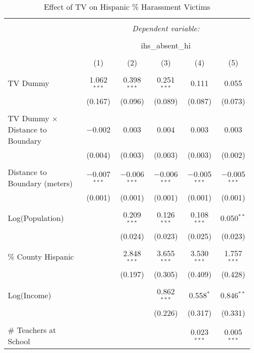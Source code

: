 
\begin{table}[!htbp] \centering 
  \caption{Effect of TV on Hispanic \% Harassment Victims} 
  \label{} 
\begin{tabular}{@{\extracolsep{-2pt}}lccccc} 
\\[-1.8ex]\hline 
\hline \\[-1.8ex] 
 & \multicolumn{5}{c}{\textit{Dependent variable:}} \\ 
\cline{2-6} 
\\[-1.8ex] & \multicolumn{5}{c}{ihs\_absent\_hi} \\ 
\\[-1.8ex] & (1) & (2) & (3) & (4) & (5)\\ 
\hline \\[-1.8ex] 
 TV Dummy & 1.062$^{***}$ & 0.398$^{***}$ & 0.251$^{***}$ & 0.111 & 0.055 \\ 
  & (0.167) & (0.096) & (0.089) & (0.087) & (0.073) \\ 
  & & & & & \\ 
 TV Dummy $\times$ Distance to Boundary & $-$0.002 & 0.003 & 0.004 & 0.003 & 0.003 \\ 
  & (0.004) & (0.003) & (0.003) & (0.003) & (0.002) \\ 
  & & & & & \\ 
 Distance to Boundary (meters) & $-$0.007$^{***}$ & $-$0.006$^{***}$ & $-$0.006$^{***}$ & $-$0.005$^{***}$ & $-$0.005$^{***}$ \\ 
  & (0.001) & (0.001) & (0.001) & (0.001) & (0.001) \\ 
  & & & & & \\ 
 Log(Population) &  & 0.209$^{***}$ & 0.126$^{***}$ & 0.108$^{***}$ & 0.050$^{**}$ \\ 
  &  & (0.024) & (0.023) & (0.025) & (0.023) \\ 
  & & & & & \\ 
 \% County Hispanic &  & 2.848$^{***}$ & 3.655$^{***}$ & 3.530$^{***}$ & 1.757$^{***}$ \\ 
  &  & (0.197) & (0.305) & (0.409) & (0.428) \\ 
  & & & & & \\ 
 Log(Income) &  &  & 0.862$^{***}$ & 0.558$^{*}$ & 0.846$^{**}$ \\ 
  &  &  & (0.226) & (0.317) & (0.331) \\ 
  & & & & & \\ 
 \# Teachers at School &  &  &  & 0.023$^{***}$ & 0.005$^{***}$ \\ 

\end{tabular}
\end{table}
